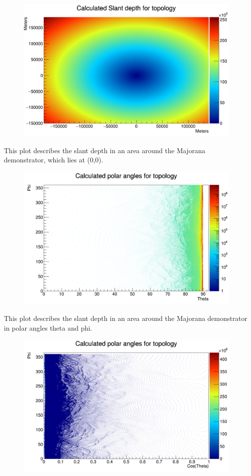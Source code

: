 \documentclass[a4paper,12pt]{article}
\begin{document}
\begin{figure}[H]
\centering
\includegraphics[scale=0.3]{slantDepthTop.png}
\end{figure}

This plot describes the slant depth in an area around the Majorana demonstrator, which lies at (0,0).

\begin{figure}[H]
\centering
\includegraphics[scale=0.3]{polarAnglesTop.png}
\end{figure}

This plot describes the slant depth in an area around the Majorana demonstrator in polar angles theta and phi.

\begin{figure}[H]
\centering
\includegraphics[scale=0.3]{polarAnglesTop2.png}
\end{figure}
\end{document}
